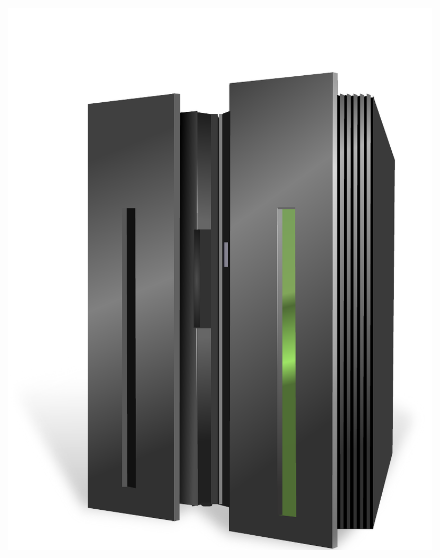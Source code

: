 \begin{frame}
\begin{columns}
\begin{figure}
      \includegraphics[scale=0.2]{images/supercomputer.pdf}
    \end{figure}
  \end{columns}
\end{frame}

